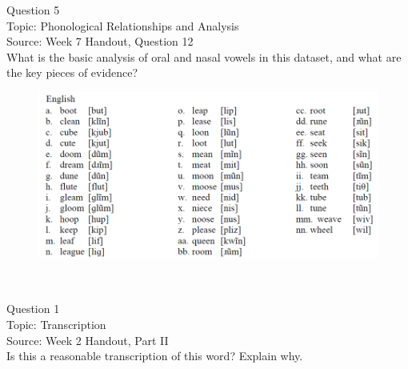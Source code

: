 \documentclass[12pt]{article}
\begin{document}
\newpage

{\large Question 5}\\

Topic: Phonological Relationships and Analysis\\
Source: Week 7 Handout, Question 12\\

What is the basic analysis of oral and nasal vowels in this dataset, and what are the key pieces of evidence?\\

\begin{figure}[H]
\includegraphics{../images/english12.png}
\end{figure}

\newpage

\begin{center}
\textbf{{\color{red}{\HUGE END OF EXAM}}}\\

\end{center}
\newpage

\begin{center}
\textbf{{\color{blue}{\HUGE START OF EXAM\\}}}

\textbf{{\color{blue}{\HUGE Student ID: 80652\\}}}

\textbf{{\color{blue}{\HUGE \\}}}

\end{center}
\newpage

{\large Question 1}\\

Topic: Transcription\\
Source: Week 2 Handout, Part II\\

Is this a reasonable transcription of this word? Explain why.\\
\end{document}
